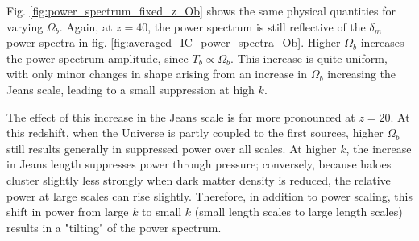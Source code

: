 \documentclass[floats,floatfix,showpacs,amssymb,prd,superscriptaddress,nofootinbib]{revtex4-2} %
\begin{document}


Fig. \ref{fig:power_spectrum_fixed_z_Ob} shows the same physical quantities for varying $\Omega_b$. Again, at $z = 40$, the power spectrum is still reflective of the $\delta_m$ power spectra in fig. \ref{fig:averaged_IC_power_spectra_Ob}. Higher $\Omega_b$ increases the power spectrum amplitude, since $T_b \propto \Omega_b$.  This increase is quite uniform, with only minor changes in shape arising from an increase in $\Omega_b$ increasing the Jeans scale, leading to a small suppression at high $k$. 

The effect of this increase in the Jeans scale is far more pronounced at $z = 20$. At this redshift, when the Universe is partly coupled to the first sources, higher $\Omega_b$ still results generally in suppressed power over all scales. At higher $k$, the increase in Jeans length suppresses power through pressure; conversely, because haloes cluster slightly less strongly when dark matter density is reduced, the relative power at large scales can rise slightly. Therefore, in addition to power scaling, this shift in power from large $k$ to small $k$ (small length scales to large length scales) results in a "tilting" of the power spectrum.
\end{document}
